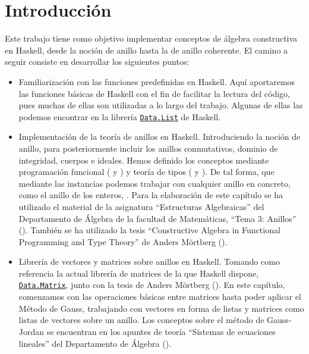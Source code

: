 \label{sec:introHas}
\chapter*{Introducción}

Este trabajo tiene como objetivo implementar conceptos de álgebra constructiva en Haskell, desde la noción de anillo hasta la de anillo coherente. El camino a seguir consiste en desarrollar los siguientes puntos:
\begin{itemize}
\item Familiarización con las funciones predefinidas en Haskell. Aquí aportaremos las funciones básicas de Haskell con el fin de facilitar la lectura del código, pues muchas de ellas son utilizadas a lo largo del trabajo. Algunas de ellas las podemos encontrar en la librería \href{http://hackage.haskell.org/package/base-4.11.1.0/docs/Data-List.html}{\texttt{Data.List}}  de Haskell.

\item Implementación de la teoría de anillos en Haskell. Introduciendo la noción de anillo, para posteriormente incluir los anillos conmutativos, dominio de integridad, cuerpos e ideales. Hemos definido los conceptos mediante programación funcional (\cite{Alonso-15b} y \cite{Hutton-16}) y teoría de tipos (\cite{Alonso-16a} y \cite{aprendehaskell}). De tal forma, que mediante las instancias podemos trabajar con cualquier anillo en concreto, como el anillo de los enteros, . Para la elaboración de este capítulo se ha utilizado el material de la asignatura ``Estructuras Algebraicas'' del Departamento de Álgebra de la facultad de Matemáticas, ``Tema 3: Anillos'' (\cite{Algebra-15}). También se ha utilizado la tesis ``Constructive Algebra in Functional Programming and Type Theory'' de Anders Mörtberg (\cite{tesis}).

\item Librería de vectores y matrices sobre anillos en Haskell. Tomando como referencia la actual librería de matrices de la que Haskell dispone, \href{https://hackage.haskell.org/package/matrix-0.3.6.1/docs/Data-Matrix.html}{\texttt{Data.Matrix}}, junto con la tesis de Anders Mörtberg (\cite{tesis}). En este capítulo, comenzamos con las operaciones básicas entre matrices hasta poder aplicar el Método de Gauss, trabajando con vectores en forma de listas y matrices como listas de vectores sobre un anillo. Los conceptos sobre el método de Gauss-Jordan se encuentran en los apuntes de teoría ``Sistemas de ecuaciones lineales'' del Departamento de Álgebra (\cite{gauss}).


\end{itemize}
